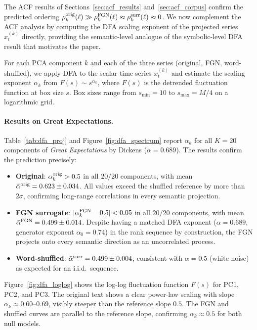 \documentclass[preprint]{elsarticle}
\begin{document}
The ACF results of Sections~\ref{sec:acf_results}
and~\ref{sec:acf_corpus} confirm the predicted ordering
$\rho_k^{\rm orig}(\ell) \gg \rho_k^{\rm FGN}(\ell) \approx
\rho_k^{\rm surr}(\ell) \approx 0$.
We now complement the ACF analysis by computing the DFA scaling
exponent of the projected series $x_t^{(k)}$ directly, providing the
semantic-level analogue of the
symbolic-level DFA result that motivates the paper.

For each PCA component $k$ and each of the three series
(original, FGN, word-shuffled), we apply DFA to the scalar
time series $x_t^{(k)}$ and estimate the scaling exponent
$\alpha_k$ from $F(s) \sim s^{\alpha_k}$, where $F(s)$ is the
detrended fluctuation function at box size $s$.
Box sizes range from $s_{\min} = 10$ to $s_{\max} = M/4$
on a logarithmic grid.

\paragraph{Results on Great Expectations.}
Table~\ref{tab:dfa_proj} and Figure~\ref{fig:dfa_spectrum}
report $\alpha_k$ for all $K = 20$ components of
\emph{Great Expectations} by Dickens ($\alpha = 0.689$).
The results confirm the prediction precisely:

\begin{itemize}
  \item \textbf{Original}: $\alpha_k^{\rm orig} > 0.5$ in all
        $20/20$ components, with mean
        $\bar\alpha^{\rm orig} = 0.623 \pm 0.034$.
        All values exceed the shuffled reference by more than
        $2\sigma$, confirming long-range correlations in every
        semantic projection.

  \item \textbf{FGN surrogate}: $|\alpha_k^{\rm FGN} - 0.5| < 0.05$
        in all $20/20$ components, with mean
        $\bar\alpha^{\rm FGN} = 0.499 \pm 0.014$.
        Despite having a matched DFA exponent ($\alpha=0.689$,
        generator exponent $\alpha_0=0.74$) in the rank sequence
        by construction, the FGN projects
        onto every semantic direction as an uncorrelated process.

  \item \textbf{Word-shuffled}: $\bar\alpha^{\rm surr} =
        0.499 \pm 0.004$, consistent with $\alpha = 0.5$
        (white noise) as expected for an i.i.d.\ sequence.
\end{itemize}


Figure~\ref{fig:dfa_loglog} shows the log-log fluctuation
function $F(s)$ for PC1, PC2, and PC3.
The original text shows a clear power-law scaling with
slope $\alpha_k \approx 0.60$--$0.69$, visibly steeper than
the reference slope $0.5$.
The FGN and shuffled curves are parallel to the reference slope,
confirming $\alpha_k \approx 0.5$ for both null models.
\end{document}
